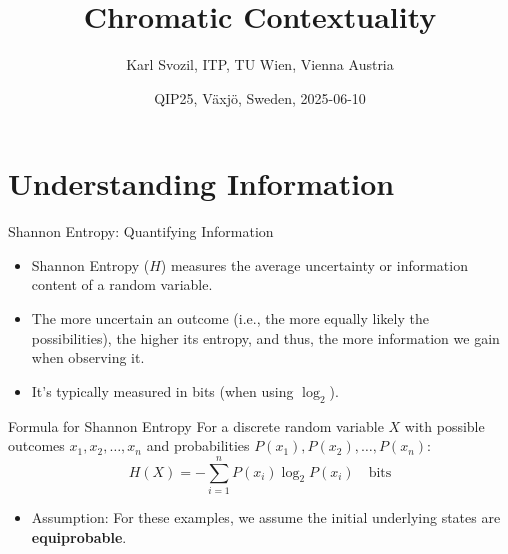 \documentclass{beamer}
\title{Chromatic Contextuality}
\author{Karl Svozil, ITP, TU Wien, Vienna Austria}
\date{QIP25, V\"axj\"o, Sweden, 2025-06-10}
\begin{document}
\frame{\titlepage}

\section{Understanding Information}
\begin{frame}{Shannon Entropy: Quantifying Information}
    \begin{itemize}
        \item Shannon Entropy ($H$) measures the \alert{average uncertainty} or \alert{information content} of a random variable.
        \item The more uncertain an outcome (i.e., the more equally likely the possibilities), the higher its entropy, and thus, the more information we gain when observing it.
        \item It's typically measured in \alert{bits} (when using $\log_2$).
    \end{itemize}
    \pause
    \begin{block}{Formula for Shannon Entropy}
        For a discrete random variable $X$ with possible outcomes $x_1, x_2, \ldots, x_n$ and probabilities $P(x_1), P(x_2), \ldots, P(x_n)$:
        \begin{equation*}
            H(X) = -\sum_{i=1}^{n} P(x_i) \log_2 P(x_i) \quad \text{bits}
        \end{equation*}
    \end{block}
    \pause
    \begin{itemize}
        \item \alert{Assumption:} For these examples, we assume the initial underlying states are \textbf{equiprobable}.
    \end{itemize}
\end{frame}

\end{document}
